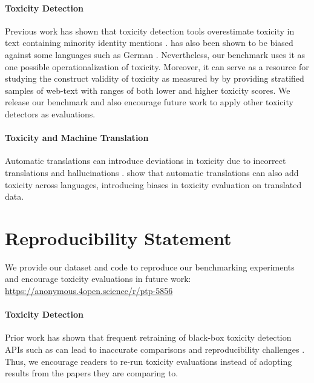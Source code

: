 \paragraph{Toxicity Detection} Previous work has shown that toxicity detection tools overestimate toxicity in text containing minority identity mentions \citep{10.1145/3278721.3278729, hutchinson-etal-2020-social, sap-etal-2019-risk}. \perspectiveAPI has also been shown to be biased against some languages such as German \citep{nogara2023toxic}. Nevertheless, our benchmark uses it as one possible operationalization of toxicity. Moreover, it can serve as a resource for studying the construct validity of toxicity as measured by \perspectiveAPI by providing stratified samples of web-text with ranges of both lower and higher toxicity scores. We release our benchmark and also encourage future work to apply other toxicity detectors as evaluations.

\paragraph{Toxicity and Machine Translation} Automatic translations can introduce deviations in toxicity due to incorrect translations and hallucinations \citep{specia-etal-2021-findings, sharou-specia-2022-taxonomy}.  
\citet{nllbteam2022language, costa-jussa-etal-2023-toxicity} show that automatic translations can also add toxicity across languages, introducing biases in toxicity evaluation on translated data.%

\section*{Reproducibility Statement}
\label{sec: reprod-statement}

We provide our dataset and code to reproduce our benchmarking experiments and encourage toxicity evaluations in future work: \url{https://anonymous.4open.science/r/ptp-5856}

\paragraph{Toxicity Detection} Prior work has shown that frequent retraining of black-box toxicity detection APIs such as \perspectiveAPI can lead to inaccurate comparisons and reproducibility challenges \citep{pozzobon-etal-2023-challenges}. Thus, we encourage readers to  re-run toxicity evaluations instead of adopting results from the papers they are comparing to.

